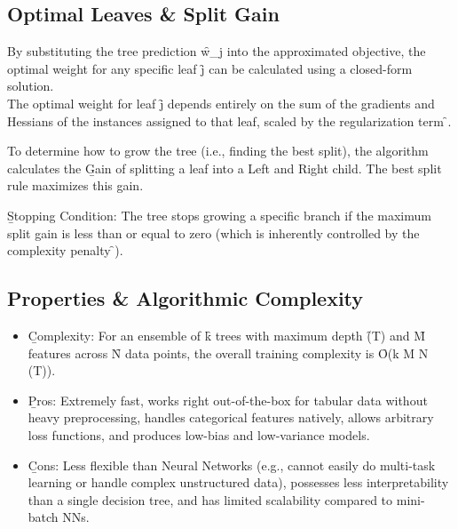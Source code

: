 \subsection{Optimal Leaves \& Split Gain}

By substituting the tree prediction \f{w_j} into the approximated objective, the optimal weight for any specific leaf \f{j} can be calculated using a closed-form solution.\\
The optimal weight for leaf \f{j} depends entirely on the sum of the gradients and Hessians of the instances assigned to that leaf, scaled by the regularization term \f{\lambda}.

To determine how to grow the tree (i.e., finding the best split), the algorithm calculates the \b{Gain} of splitting a leaf into a Left and Right child. The best split rule maximizes this gain.

\b{Stopping Condition}: The tree stops growing a specific branch if the maximum split gain is less than or equal to zero (which is inherently controlled by the complexity penalty \f{\gamma}).






\subsection{Properties \& Algorithmic Complexity}

\begin{itemize}
\item \b{Complexity}: For an ensemble of \f{k} trees with maximum depth \f{\log(T)} and \f{M} features across \f{N} data points, the overall training complexity is \f{O(k M N \log(T))}.
\item \b{Pros}: Extremely fast, works right out-of-the-box for tabular data without heavy preprocessing, handles categorical features natively, allows arbitrary loss functions, and produces low-bias and low-variance models.
\item \b{Cons}: Less flexible than Neural Networks (e.g., cannot easily do multi-task learning or handle complex unstructured data), possesses less interpretability than a single decision tree, and has limited scalability compared to mini-batch NNs.
\end{itemize}



